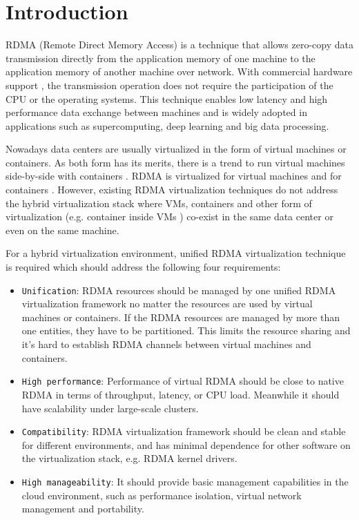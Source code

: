 \section{Introduction}
RDMA (Remote Direct Memory Access) is a technique that allows zero-copy data transmission directly from the application memory of one machine to the application memory of another machine over network. With commercial hardware support \cite{roce, iwarp, infiniband}, the transmission operation does not require the participation of the CPU or the operating systems. This technique enables low latency and high performance data exchange between machines and is widely adopted in applications such as supercomputing, deep learning and big data processing.

Nowadays data centers are usually virtualized in the form of virtual machines or containers. As both form has its merits, there is a trend to run virtual machines side-by-side with containers \cite{rethinkingvirtualization}.
RDMA is virtualized for virtual machines \cite{pfefferle2015hybrid, he2020masq} and for containers \cite{kim2019freeflow}.
However, existing RDMA virtualization techniques do not address the hybrid virtualization stack where VMs, containers and other form of virtualization (e.g. container inside VMs \cite{containeronvm}) co-exist in the same data center or even on the same machine.

For a hybrid virtualization environment, unified RDMA virtualization technique is required which should address the following four requirements:

\begin{itemize}
	\item {\verb|Unification|}: RDMA resources should be managed by one unified RDMA virtualization framework no matter the resources are used by virtual machines or containers. If the RDMA resources are managed by more than one entities, they have to be partitioned. This limits the resource sharing and it's hard to establish RDMA channels between virtual machines and containers.
	\item {\verb|High performance|}: Performance of virtual RDMA should be close to native RDMA in terms of throughput, latency, or CPU load. Meanwhile it should have scalability under large-scale clusters.
	\item {\verb|Compatibility|}: RDMA virtualization framework should be clean and stable for different environments, and has minimal dependence for other software on the virtualization stack, e.g. RDMA kernel drivers.
	\item {\verb|High manageability|}: It should provide basic management capabilities in the cloud environment, such as performance isolation, virtual network management and portability.
\end{itemize}

